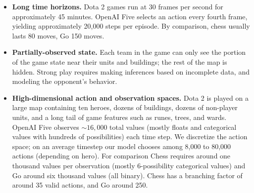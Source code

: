 \documentclass[11pt]{article}
\newcommand{\obssize}{$\sim16,000$\xspace}
\newcommand\todo[1]{\textcolor{red}{TODO: #1}}
\newcommand{\dota}{Dota 2\xspace}
\newcommand{\openaifive}{OpenAI Five\xspace}
\begin{document}
\begin{itemize}
\item \textbf{Long time horizons.}
\dota games run at 30 frames per second for approximately 45 minutes.
\openaifive selects an action every fourth frame, yielding approximately 20,000 steps per episode. By comparison, chess usually lasts 80 moves, Go 150 moves\cite{Allis1994branching}. 

\item \textbf{Partially-observed state.}
Each team in the game can only see the portion of the game state near their units and buildings; the rest of the map is hidden. 
Strong play requires making inferences based on incomplete data, and modeling the opponent's behavior. 

\item\textbf{High-dimensional action and observation spaces.}
\dota is played on a large map containing ten heroes, dozens of buildings, dozens of non-player units, and a long tail of game features such as runes, trees, and wards. 
\openaifive observes \obssize total values (mostly floats and categorical values with hundreds of possibilities) each time step. 
We discretize the action space; on an average timestep our model chooses among 8,000 to 80,000 actions (depending on hero).
For comparison Chess requires around one thousand values per observation (mostly 6-possibility categorical values) 
and Go around six thousand values (all binary)\cite{silver2018general}. 
Chess has a branching factor of around 35 valid actions, and Go around 250\cite{Allis1994branching}.
\end{itemize}
\end{document}

